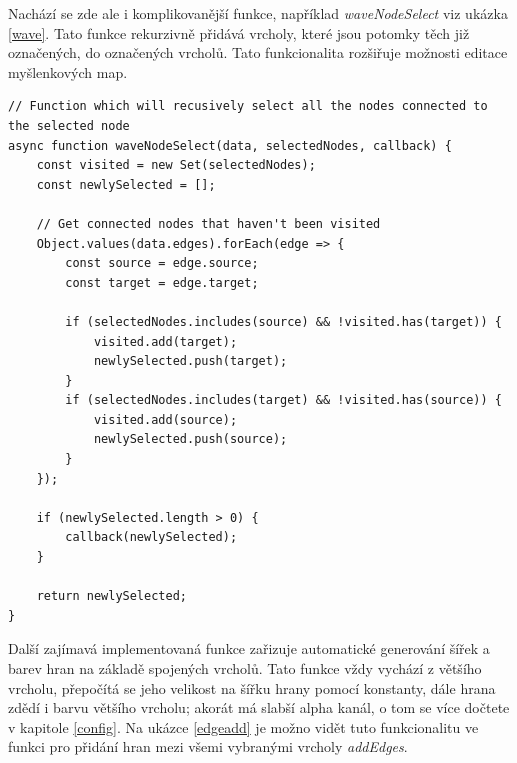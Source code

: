 Nachází se zde ale i komplikovanější funkce, například \textit{waveNodeSelect} viz ukázka \ref{wave}. Tato funkce rekurzivně přidává vrcholy, které jsou potomky těch již označených, do označených vrcholů. Tato funkcionalita rozšiřuje možnosti editace myšlenkových map.
\newpage
\begin{lstlisting}[style=JavaScript, firstnumber = 264, caption={utils/graphManager.js, wave select},
label={wave}]
// Function which will recusively select all the nodes connected to the selected node
async function waveNodeSelect(data, selectedNodes, callback) {
    const visited = new Set(selectedNodes);
    const newlySelected = [];
    
    // Get connected nodes that haven't been visited
    Object.values(data.edges).forEach(edge => {
        const source = edge.source;
        const target = edge.target;
        
        if (selectedNodes.includes(source) && !visited.has(target)) {
            visited.add(target);
            newlySelected.push(target);
        }
        if (selectedNodes.includes(target) && !visited.has(source)) {
            visited.add(source);
            newlySelected.push(source);
        }
    });

    if (newlySelected.length > 0) {
        callback(newlySelected);
    }
    
    return newlySelected;
}
\end{lstlisting}
Další zajímavá implementovaná funkce zařizuje automatické generování šířek a barev hran na základě spojených vrcholů. Tato funkce vždy vychází z většího vrcholu, přepočítá se jeho velikost na šířku hrany pomocí konstanty, dále hrana zdědí i barvu většího vrcholu; akorát má slabší alpha kanál, o tom se více dočtete v kapitole \ref{config}. Na ukázce \ref{edgeadd} je možno vidět tuto funkcionalitu ve funkci pro přidání hran mezi všemi vybranými vrcholy \textit{addEdges}.
\newpage

